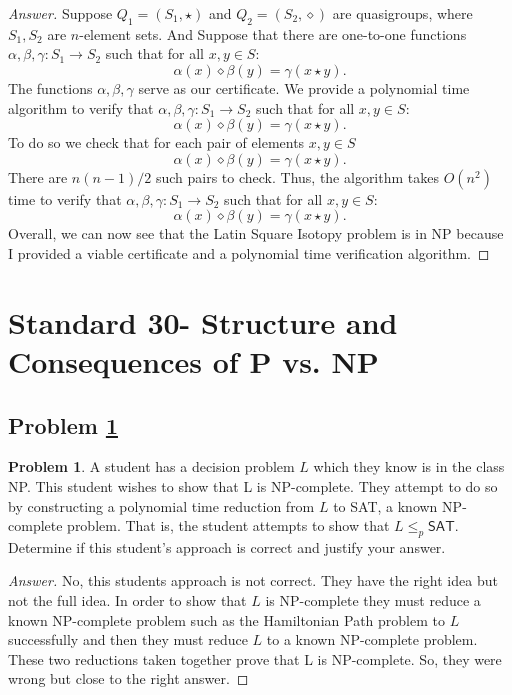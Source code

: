 \documentclass[11pt]{article}
\theoremstyle{definition}
\theoremstyle{definition}
\newtheorem{required}{Problem}
\theoremstyle{definition}
\begin{document}
\begin{proof}[Answer]

Suppose $Q_{1} = (S_{1}, \star)$ and $Q_{2} = (S_{2}, \diamond)$ are quasigroups, where $S_{1}, S_{2}$ are $n$-element sets. And Suppose that there are one-to-one functions $\alpha, \beta, \gamma : S_{1} \to S_{2}$ such that for all $x, y \in S$: 
\[
\alpha(x) \diamond \beta(y) = \gamma(x \star y).
\] 
The functions $\alpha, \beta, \gamma$ serve as our certificate. We provide a polynomial time algorithm to verify that $\alpha, \beta, \gamma : S_{1} \to S_{2}$ such that for all $x, y \in S$: 
\[
\alpha(x) \diamond \beta(y) = \gamma(x \star y).
\] To do so we check that for each pair of elements $x,y \in S$  \[
\alpha(x) \diamond \beta(y) = \gamma(x \star y).
\] There are $n(n-1)/2$ such pairs to check. Thus, the algorithm takes $O(n^2)$ time to verify that $\alpha, \beta, \gamma : S_{1} \to S_{2}$ such that for all $x, y \in S$: 
\[
\alpha(x) \diamond \beta(y) = \gamma(x \star y).
\] Overall, we can now see that the Latin Square Isotopy problem is in NP because I provided a viable certificate and a polynomial time verification algorithm.
\end{proof}


\newpage
\section{Standard 30- Structure and Consequences of \textsf{P} vs. \textsf{NP}}

\subsection{Problem \ref{S30Prob1}}
\begin{required} \label{S30Prob1}
A student has a decision problem $L$ which they know is in the class \textsf{NP}. This student wishes to show that L is \textsf{NP}-complete. They attempt to do so by constructing a polynomial time reduction from $L$ to \textsf{SAT}, a known \textsf{NP}-complete problem. That is, the student attempts to show that $L \leq_{p} \textsf{SAT}.$ Determine if this student’s approach is
correct and justify your answer.
\end{required}

\begin{proof}[Answer]
No, this students approach is not correct. They have the right idea but not the full idea. In order to show that $L$ is NP-complete they must reduce a known NP-complete problem such as the Hamiltonian Path problem to $L$ successfully and then they must reduce $L$ to a known NP-complete problem. These two reductions taken together prove that L is NP-complete. So, they were wrong but close to the right answer. 
\end{proof}
\end{document}
